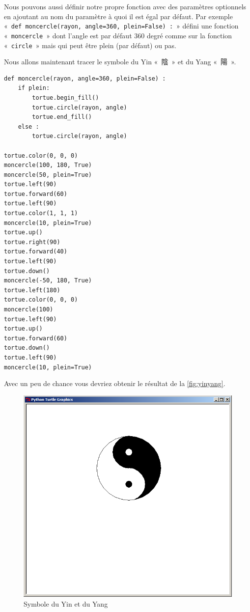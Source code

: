 Nous pouvons aussi définir notre propre fonction avec des paramètres optionnels en ajoutant au nom du paramètre à quoi il est égal par défaut. Par exemple «~\texttt{def moncercle(rayon, angle=360, plein=False) :}~» défini une fonction «~\texttt{moncercle}~»  dont l'angle est par défaut 360 degré comme sur la fonction «~\texttt{circle}~» mais qui peut être plein (par défaut) ou pas.


Nous allons maintenant tracer le symbole du Yin «~{陰}~»  et du Yang «~{陽}~».

\begin{Verbatim}[frame=single,rulecolor=\color{mbleu}, label=à taper]
def moncercle(rayon, angle=360, plein=False) :
    if plein:
        tortue.begin_fill()
        tortue.circle(rayon, angle)
        tortue.end_fill()
    else :
        tortue.circle(rayon, angle)

tortue.color(0, 0, 0)
moncercle(100, 180, True)
moncercle(50, plein=True)
tortue.left(90)
tortue.forward(60)
tortue.left(90)
tortue.color(1, 1, 1)
moncercle(10, plein=True)
tortue.up()
tortue.right(90)
tortue.forward(40)
tortue.left(90)
tortue.down()
moncercle(-50, 180, True)
tortue.left(180)
tortue.color(0, 0, 0)
moncercle(100)
tortue.left(90)
tortue.up()
tortue.forward(60)
tortue.down()
tortue.left(90)
moncercle(10, plein=True)
\end{Verbatim}

Avec un peu de chance vous devriez obtenir le résultat de la \autoref{fig:yinyang}.

\begin{figure}[h!]
\centering
\includegraphics[scale=0.4]{images/yinyang}
\caption{Symbole du Yin et du Yang}\label{fig:yinyang}
\end{figure}

